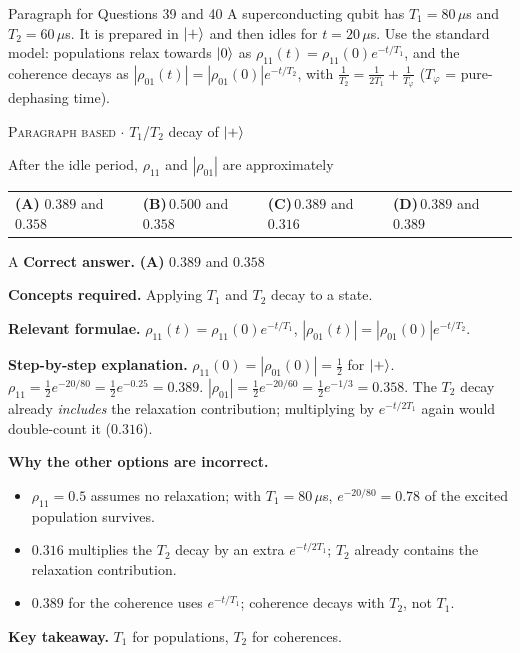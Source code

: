 \documentclass[11pt,a4paper]{article}
\newcommand{\optlabel}[1]{\textbf{(#1)}}
\newcommand{\correctlabel}[1]{\textcolor{okgreen}{\textbf{(#1)}\,\ding{51}}}
\newenvironment{qitem}[1]{\begin{list}{}{\setlength{\leftmargin}{3.3em}\setlength{\labelwidth}{3.1em}%
  \setlength{\labelsep}{0.2em}\setlength{\topsep}{3pt}\setlength{\parsep}{3pt}}\item[\textbf{Q.#1}\hfill]}{\end{list}}
\newcommand{\qsep}{\par\vspace{2pt}{\color{black!15}\hrule}\vspace{4pt}}
\newcommand{\qmeta}[2]{{\footnotesize\color{black!60}\textsc{#1} \;$\cdot$\; #2}\par}
\begin{document}
\begin{passagebox}{Paragraph for Questions 39 and 40}
A superconducting qubit has $T_1 = 80\,\mu$s and $T_2 = 60\,\mu$s. It is prepared in $\ket+$ and then idles for $t = 20\,\mu$s.
Use the standard model: populations relax towards $\ket0$ as $\rho_{11}(t) = \rho_{11}(0)e^{-t/T_1}$, and the coherence decays as
$|\rho_{01}(t)| = |\rho_{01}(0)|e^{-t/T_2}$, with $\frac{1}{T_2} = \frac{1}{2T_1} + \frac{1}{T_\varphi}$ ($T_\varphi$ = pure-dephasing time).
\end{passagebox}
\begin{qitem}{39}
\qmeta{Paragraph based}{$T_1$/$T_2$ decay of $\ket+$}
After the idle period, $\rho_{11}$ and $|\rho_{01}|$ are approximately
\par\smallskip\noindent\begin{tabularx}{\linewidth}{@{}*{4}{L}@{}}
\correctlabel{A}\,$0.389$ and $0.358$ & \optlabel{B}\,$0.500$ and $0.358$ & \optlabel{C}\,$0.389$ and $0.316$ & \optlabel{D}\,$0.389$ and $0.389$
\end{tabularx}
\end{qitem}
\begin{solbox}{A}
\textbf{\color{brand}Correct answer.} \textcolor{okgreen}{\textbf{(A)}} $0.389$ and $0.358$

\textbf{\color{brand}Concepts required.} Applying $T_1$ and $T_2$ decay to a state.

\textbf{\color{brand}Relevant formulae.} $\rho_{11}(t) = \rho_{11}(0)e^{-t/T_1}$, $|\rho_{01}(t)| = |\rho_{01}(0)|e^{-t/T_2}$.

\textbf{\color{brand}Step-by-step explanation.} $\rho_{11}(0) = |\rho_{01}(0)| = \frac12$ for $\ket+$. $\rho_{11} = \frac12e^{-20/80} = \frac12e^{-0.25} = 0.389$.
$|\rho_{01}| = \frac12e^{-20/60} = \frac12e^{-1/3} = 0.358$. The $T_2$ decay already \emph{includes} the relaxation contribution; multiplying by
$e^{-t/2T_1}$ again would double-count it ($0.316$).

\textbf{\color{brand}Why the other options are incorrect.}
\begin{itemize}[leftmargin=2.4em, itemsep=1pt, topsep=2pt]
\item[\textbf{(B)}] $\rho_{11} = 0.5$ assumes no relaxation; with $T_1 = 80\,\mu$s, $e^{-20/80} = 0.78$ of the excited population survives.
\item[\textbf{(C)}] $0.316$ multiplies the $T_2$ decay by an extra $e^{-t/2T_1}$; $T_2$ already contains the relaxation contribution.
\item[\textbf{(D)}] $0.389$ for the coherence uses $e^{-t/T_1}$; coherence decays with $T_2$, not $T_1$.
\end{itemize}
\textbf{\color{brand}Key takeaway.} $T_1$ for populations, $T_2$ for coherences.
\end{solbox}
\qsep
\end{document}
